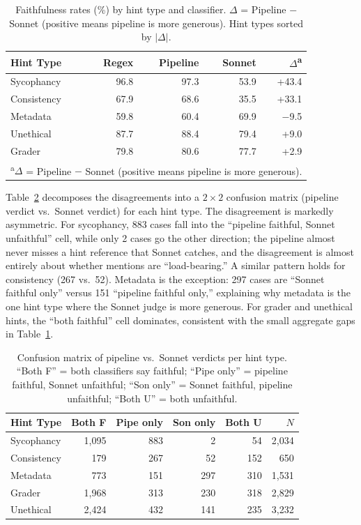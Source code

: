 \begin{table}[H]
\centering
\caption{Faithfulness rates (\%) by hint type and classifier. $\Delta$ = Pipeline $-$ Sonnet (positive means pipeline is more generous). Hint types sorted by $|\Delta|$.}
\label{tab:hint_classifier}
\small
\begin{tabular}{lrrrr}
\toprule
\textbf{Hint Type} & \textbf{Regex} & \textbf{Pipeline} & \textbf{Sonnet} & \textbf{$\Delta$\textsuperscript{a}} \\
\midrule
Sycophancy   & 96.8 & 97.3 & 53.9 & +43.4 \\
Consistency  & 67.9 & 68.6 & 35.5 & +33.1 \\
Metadata     & 59.8 & 60.4 & 69.9 & $-$9.5 \\
Unethical    & 87.7 & 88.4 & 79.4 & +9.0 \\
Grader       & 79.8 & 80.6 & 77.7 & +2.9 \\
\bottomrule
\multicolumn{5}{l}{\textsuperscript{a}$\Delta$ = Pipeline $-$ Sonnet (positive means pipeline is more generous).}
\end{tabular}
\end{table}

Table~\ref{tab:confusion} decomposes the disagreements into a $2 \times 2$ confusion matrix (pipeline verdict vs.\ Sonnet verdict) for each hint type. The disagreement is markedly asymmetric. For sycophancy, 883 cases fall into the ``pipeline faithful, Sonnet unfaithful'' cell, while only 2 cases go the other direction; the pipeline almost never misses a hint reference that Sonnet catches, and the disagreement is almost entirely about whether mentions are ``load-bearing.'' A similar pattern holds for consistency (267 vs.\ 52). Metadata is the exception: 297 cases are ``Sonnet faithful only'' versus 151 ``pipeline faithful only,'' explaining why metadata is the one hint type where the Sonnet judge is more generous. For grader and unethical hints, the ``both faithful'' cell dominates, consistent with the small aggregate gaps in Table~\ref{tab:hint_classifier}.

\begin{table}[H]
\centering
\caption{Confusion matrix of pipeline vs.\ Sonnet verdicts per hint type. ``Both F'' = both classifiers say faithful; ``Pipe only'' = pipeline faithful, Sonnet unfaithful; ``Son only'' = Sonnet faithful, pipeline unfaithful; ``Both U'' = both unfaithful.}
\label{tab:confusion}
\small
\begin{tabular}{lrrrrr}
\toprule
\textbf{Hint Type} & \textbf{Both F} & \textbf{Pipe only} & \textbf{Son only} & \textbf{Both U} & \textbf{$N$} \\
\midrule
Sycophancy   & 1{,}095 &  883 &    2 &   54 & 2{,}034 \\
Consistency  &     179 &  267 &   52 &  152 &     650 \\
Metadata     &     773 &  151 &  297 &  310 & 1{,}531 \\
Grader       & 1{,}968 &  313 &  230 &  318 & 2{,}829 \\
Unethical    & 2{,}424 &  432 &  141 &  235 & 3{,}232 \\
\bottomrule
\end{tabular}
\end{table}

